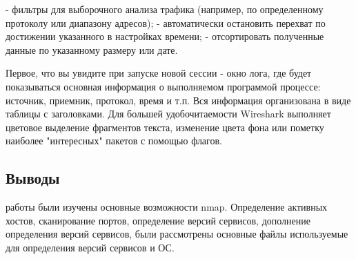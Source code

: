 \documentclass[10pt,a4paper]{article}
\begin{document}
- фильтры для выборочного анализа трафика (например, по определенному протоколу или диапазону адресов);
- автоматически остановить перехват по достижении указанного в настройках времени;
- отсортировать полученные данные по указанному размеру или дате.

Первое, что вы увидите при запуске новой сессии - окно лога, где будет показываться основная информация о выполняемом программой процессе: источник, приемник, протокол, время и т.п. Вся информация организована в виде таблицы с заголовками. Для большей удобочитаемости Wireshark выполняет цветовое выделение фрагментов текста, изменение цвета фона или пометку наиболее "интересных" пакетов с помощью флагов.


\subsection{Выводы}

 работы были изучены основные возможности nmap. Определение активных хостов, сканирование портов, определение версий сервисов, дополнение определения версий сервисов, были рассмотрены основные файлы используемые для определения версий сервисов и ОС. 
\end{document}

